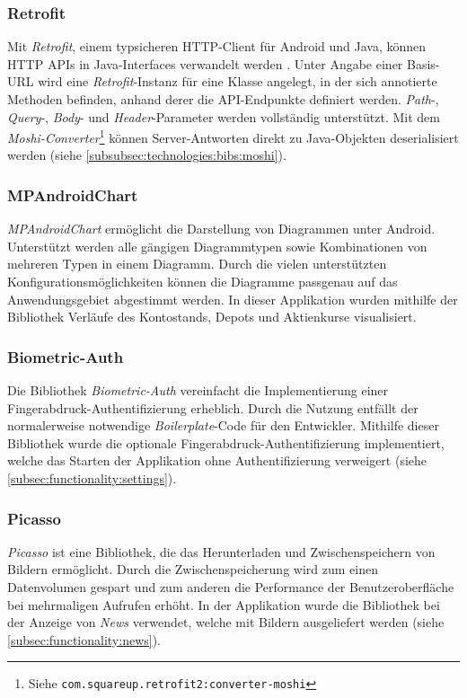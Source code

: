 \documentclass[a4paper]{article}
\begin{document}
\subsubsection{Retrofit}
\label{subsubsec:technologies:bibs:retrofit}
Mit \textit{Retrofit}, einem typsicheren HTTP-Client für Android und Java, können HTTP APIs in Java-Interfaces verwandelt werden \autocite{retrofit}.
Unter Angabe einer Basis-URL wird eine \textit{Retrofit}-Instanz für eine Klasse angelegt, in der sich annotierte Methoden befinden, anhand derer die API-Endpunkte definiert werden.
\textit{Path}-, \textit{Query}-, \textit{Body}- und \textit{Header}-Parameter werden vollständig unterstützt.
Mit dem \textit{Moshi-Converter}\footnote{Siehe \texttt{com.squareup.retrofit2:converter-moshi}} können Server-Antworten direkt zu Java-Objekten deserialisiert werden (siehe \autoref{subsubsec:technologies:bibs:moshi}).


\subsubsection{MPAndroidChart}
\label{subsubsec:technologies:bibs:mpandroidchart}
\textit{MPAndroidChart} \autocite{mpandroidchart} ermöglicht die Darstellung von Diagrammen unter Android.
Unterstützt werden alle gängigen Diagrammtypen sowie Kombinationen von mehreren Typen in einem Diagramm.
Durch die vielen unterstützten Konfigurationsmöglichkeiten können die Diagramme passgenau auf das Anwendungsgebiet abgestimmt werden.
In dieser Applikation wurden mithilfe der Bibliothek Verläufe des Kontostands, Depots und Aktienkurse visualisiert.


\subsubsection{Biometric-Auth}
\label{subsubsec:technologies:bibs:biometricauth}
Die Bibliothek \textit{Biometric-Auth} \autocite{biometricauth} vereinfacht die Implementierung einer Fin\-gerabdruck-Authentifizierung erheblich.
Durch die Nutzung entfällt der normalerweise notwendige \textit{Boilerplate}-Code für den Entwickler.
Mithilfe dieser Bibliothek wurde die optionale Fingerabdruck-Authentifizierung implementiert, welche das Starten der Applikation ohne Authentifizierung verweigert (siehe \autoref{subsec:functionality:settings}).


\subsubsection{Picasso}
\label{subsubsec:technologies:bibs:picasso}
\textit{Picasso} \autocite{picasso} ist eine Bibliothek, die das Herunterladen und Zwischenspeichern von Bildern ermöglicht.
Durch die Zwischenspeicherung wird zum einen Datenvolumen gespart und zum anderen die Performance der Benutzeroberfläche bei mehrmaligen Aufrufen erhöht.
In der Applikation wurde die Bibliothek bei der Anzeige von \textit{News} verwendet, welche mit Bildern ausgeliefert werden (siehe \autoref{subsec:functionality:news}).
\end{document}
